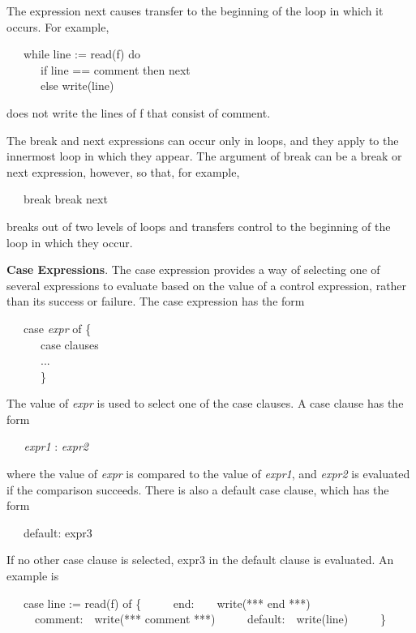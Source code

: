 The expression next causes transfer to the beginning of the loop in
which it occurs. For example,

{\ttfamily\mdseries
\ \ \ while line := read(f) do \\
\ \ \ \ \ \ if line == {\textquotedbl}comment{\textquotedbl} then next \\
\ \ \ \ \ \ else write(line)}

\noindent does not write the lines of f that consist of
{\textquotedbl}comment{\textquotedbl}.

The break and next expressions can occur only in loops, and they apply
to the innermost loop in which they appear. The argument of break can
be a break or next expression, however, so that, for example,

{\ttfamily\mdseries
\ \ \ break break next}

\noindent breaks out of two levels of loops and transfers control to
the beginning of the loop in which they occur.


\textbf{Case Expressions}. The case expression provides a way of
selecting one of several expressions to evaluate based on the value of
a control expression, rather than its success or failure. The case
expression has the form

{\ttfamily\mdseries
\ \ \ case \textit{expr} of \{\\
\ \ \ \ \ \ case clauses \\
\ \ \ \ \ \ ... \\
\ \ \ \ \ \ \}}

The value of \textit{expr }is used to select one of the case
clauses. A case clause has the form

{\ttfamily\mdseries
\textit{\ \ \ expr1 }: \textit{expr2}}

\noindent where the value of \textit{expr} is compared to the value of
\textit{expr1}, and \textit{expr2} is evaluated if the comparison
succeeds. There is also a default case clause, which has the form

{\ttfamily\mdseries
\ \ \ default: expr3}


If no other case clause is selected, expr3 in the default clause is
evaluated. An example is

{\ttfamily\mdseries
\ \ \ case line := read(f) of \{\newline
 \ \ \ \ \ {\textquotedbl}end{\textquotedbl}:\ \ \ \ write({\textquotedbl}*** end ***{\textquotedbl})\newline
 \ \ \ \ \ {\textquotedbl}comment{\textquotedbl}:\ \ write({\textquotedbl}*** comment ***{\textquotedbl})\newline
 \ \ \ \ \ default:\ \ write(line)\newline
 \ \ \ \ \ \}}


